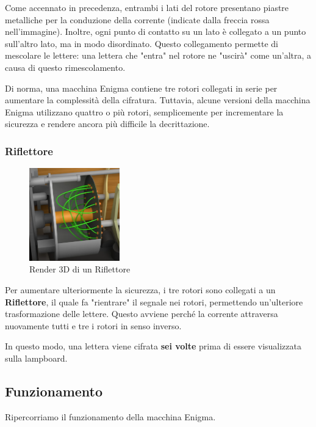\documentclass{rapport}
\begin{document}
Come accennato in precedenza, entrambi i lati del rotore presentano piastre metalliche per la conduzione della corrente (indicate dalla freccia rossa nell'immagine). Inoltre, ogni punto di contatto su un lato è collegato a un punto sull'altro lato, ma in modo disordinato. Questo collegamento permette di mescolare le lettere: una lettera che "entra" nel rotore ne "uscirà" come un'altra, a causa di questo rimescolamento.  

Di norma, una macchina Enigma contiene tre rotori collegati in serie per aumentare la complessità della cifratura. Tuttavia, alcune versioni della macchina Enigma utilizzano quattro o più rotori, semplicemente per incrementare la sicurezza e rendere ancora più difficile la decrittazione.





\subsubsection{Riflettore}
\begin{figure}
    \vspace{-1cm}
    \centering
    \includegraphics[width=0.35\textwidth]{logos/2_6cripto.png}
    \caption*{Render 3D di un Riflettore}
\end{figure}

Per aumentare ulteriormente la sicurezza, i tre rotori sono collegati a un \textbf{Riflettore}, il quale fa "rientrare" il segnale nei rotori, permettendo un'ulteriore trasformazione delle lettere. Questo avviene perché la corrente attraversa nuovamente tutti e tre i rotori in senso inverso.

In questo modo, una lettera viene cifrata \textbf{sei volte} prima di essere visualizzata sulla lampboard.

\afterpage{\clearpage}  


\newpage
\subsection{Funzionamento}
Ripercorriamo il funzionamento della macchina Enigma. 
\end{document}
